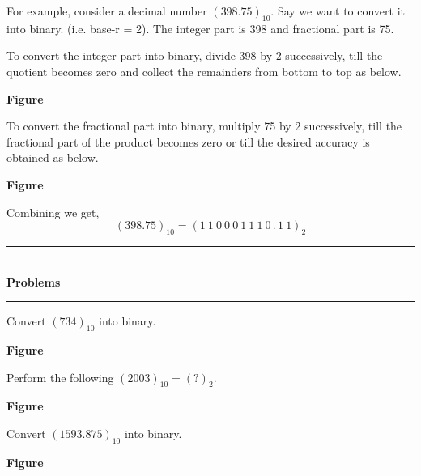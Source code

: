 For example, consider a decimal number $(398.75)_{10}$. Say we want to convert it into binary. (i.e. base-r = 2). The integer part is 398 and fractional part is 75.

To convert the integer part into binary, divide 398 by 2 successively, till the quotient becomes zero and collect the remainders from bottom to top as below.
\begin{center}
{\bf Figure}
\end{center}

To convert the fractional part into binary, multiply 75 by 2 successively, till the fractional part of the product becomes zero or till the desired accuracy is obtained as below.
\begin{center}
{\bf Figure}
\end{center}

Combining we get,
$$
(398.75)_{10}=(1~1~0~0~0~1~1~1~0\,.\,1~1)_{2}
$$

\begin{center}
\rule{4cm}{1pt}\\
{\bf\Large Problems}\\[-3pt]
\rule{4cm}{1pt}
\end{center}

\begin{problem}\label{prob5.4}
Convert $(734)_{10}$ into binary.
\end{problem}

\begin{solution}
\begin{center}
{\bf Figure}
\end{center}
\end{solution}

\begin{problem}\label{prob5.5}
Perform the following $(2003)_{10}=(?)_{2}$.
\end{problem}

\begin{solution}
\begin{center}
{\bf Figure}
\end{center}
\end{solution}

\begin{problem}
Convert $(1593.875)_{10}$ into binary.
\end{problem}

\begin{solution}
\begin{center}
{\bf Figure}
\end{center}
\end{solution}

